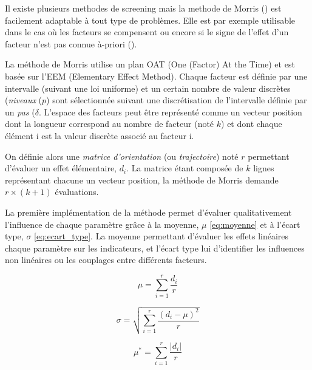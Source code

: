 Il existe plusieurs methodes de screening mais la methode de Morris  (\cite{Morris1991161})
est facilement adaptable à tout type de problèmes. Elle est par exemple utilisable dans le cas où
les facteurs se compensent ou encore si le signe de l’effet d’un facteur n’est pas
connue à-priori (\cite{Saltelli2004}).


La méthode de Morris utilise un plan OAT (One (Factor) At the Time) et est basée sur
l’EEM (Elementary Effect Method).
Chaque facteur est définie par une intervalle (suivant une loi uniforme) et un certain
nombre de valeur discrètes (\emph{niveaux} ($p$) sont sélectionnée suivant une discrétisation
de l’intervalle définie par un \emph{pas} ($\delta$. L’espace des facteurs peut être représenté
comme un vecteur position dont la longueur correspond au nombre de facteur (noté $k$) et dont chaque élément i
est la valeur discrète associé au facteur i.

On définie alors une \emph{matrice d’orientation} (ou \emph{trajectoire}) noté $r$
permettant d’évaluer un effet élémentaire, $d_{i}$. La matrice étant composée de $k$ lignes représentant
chacune un vecteur position, la méthode de Morris demande $r \times (k + 1)$ évaluations.


La première implémentation de la méthode permet d’évaluer qualitativement l’influence de chaque
paramètre grâce à la moyenne, $\mu$ \eqref{eq:moyenne} et à l’écart type, $\sigma$ \eqref{eq:ecart_type}.
La moyenne permettant d’évaluer les effets linéaires chaque paramètre sur les indicateurs,
et l’écart type lui d’identifier les influences non linéaires ou les couplages entre différents facteurs.

\begin{equation}\label{eq:moyenne}
    \mu = \sum_{i = 1}^{r} \frac{d_{i}}{r}
\end{equation}

\begin{equation}\label{eq:ecart_type}
    \sigma = \sqrt{\sum_{i=1}^{r}\frac{(d_{i} - \mu)^{2}}{r}}
\end{equation}

\begin{equation}\label{eq:moyenne_absolue}
    \mu^{*} = \sum_{i = 1}^{r} \frac{\lvert d_{i} \rvert}{r}
\end{equation}

